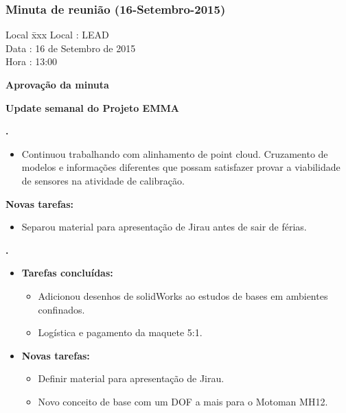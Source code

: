 \subsubsection{Minuta de reunião (16-Setembro-2015)}

\begin{tabbing}
  Local \= xxx \kill
  Local \> : LEAD \\
  Data  \> : 16 de Setembro de 2015 \\
  Hora  \> : 13:00
\end{tabbing}


\textbf{Aprovação da minuta}

\textbf{Update semanal do Projeto EMMA}
   							
							
\textbf{\gabriel.} 
	\begin{itemize}
			\item Continuou trabalhando com alinhamento de point cloud. Cruzamento de
			modelos e informações diferentes que possam satisfazer provar a viabilidade de sensores na atividade de calibração.
			\end{itemize}
		
		\item \textbf{Novas tarefas:}
			\begin{itemize} 
				\item Separou material para apresentação de Jirau antes de sair de férias.
			\end{itemize}

					
			
   \textbf{.} 
	\begin{itemize}
		\item \textbf{Tarefas concluídas:}
			\begin{itemize}  
			  \item Adicionou desenhos de solidWorks ao estudos de bases em ambientes
			  confinados.
			  \item Logística e pagamento da maquete 5:1.
			\end{itemize}
		
		\item \textbf{Novas tarefas:}
			\begin{itemize} 
				\item Definir material para apresentação de Jirau.
				\item Novo conceito de base com um DOF a mais para o Motoman MH12.
			\end{itemize}
	\end{itemize}

